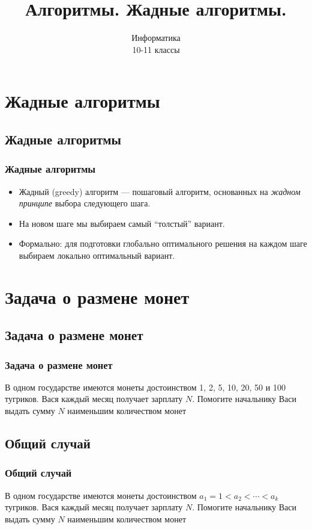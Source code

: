 \documentclass[compress,red]{beamer}
\title{Алгоритмы. Жадные алгоритмы.}
\author{Информатика \\ 10-11 классы}
\begin{document}
\maketitle

\section{Жадные алгоритмы}
\subsection{Жадные алгоритмы}
\begin{frame}[fragile]
\frametitle{Жадные алгоритмы}
		\begin{itemize}
		\item Жадный (greedy) алгоритм --- пошаговый алгоритм, основанных на \emph{жадном принципе} выбора следующего шага.
		\item На новом шаге мы выбираем самый ``толстый'' вариант.
		\item Формально: для подготовки глобально оптимального решения на каждом шаге выбираем локально оптимальный вариант.
		\end{itemize}
\end{frame}

\section{Задача о размене монет}
\subsection{Задача о размене монет}
\begin{frame}[fragile]
\frametitle{Задача о размене монет}
	\begin{center}
		\large{В одном государстве имеются монеты достоинством 1, 2, 5, 10, 20, 50 и 100 тугриков. Вася каждый месяц получает зарплату $N$. Помогите начальнику Васи выдать сумму $N$ наименьшим количеством монет}
	\end{center}
\end{frame}

\subsection{Общий случай}
\begin{frame}[fragile]
\frametitle{Общий случай}
	\begin{center}
		\large{В одном государстве имеются монеты достоинством $a_1 = 1 < a_2 < \cdots < a_k$ тугриков. Вася каждый месяц получает зарплату $N$. Помогите начальнику Васи выдать сумму $N$ наименьшим количеством монет}
	\end{center}
\end{frame}
\end{document}
